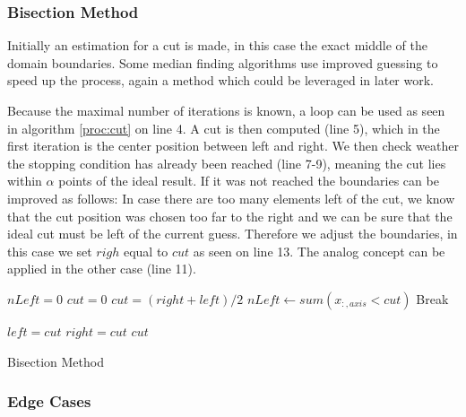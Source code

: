 \documentclass[]{article}
\begin{document}
\subsubsection{Bisection Method}

Initially an estimation for a cut is made, in this case the exact middle of the domain boundaries. Some median finding algorithms use improved guessing to speed up the process, again a method which could be leveraged in later work. 

Because the maximal number of iterations is known, a loop can be used as seen in algorithm \ref{proc:cut} on line 4. A cut is then computed (line 5), which in the first iteration is the center position between left and right. We then check weather the stopping condition has already been reached (line 7-9), meaning the cut lies within $\alpha$ points of the ideal result. If it was not reached the boundaries can be improved as follows: In case there are too many elements left of the cut, we know that the cut position was chosen too far to the right and we can be sure that the ideal cut must be left of the current guess. Therefore we adjust the boundaries, in this case we set $righ$ equal to $cut$ as seen on line 13. The analog concept can be applied in the other case (line 11). 

\begin{algorithm}[H]
		\begin{algorithmic}[1]
			\State $nLeft = 0$
			\State $cut = 0$
			\newline
			\State $cut = (right + left ) / 2 $
			\State $nLeft\gets sum(x_{:,axis} < cut)$ 
			\newline
			\State Break 
			\EndIf
			\newline
			
			\State $left = cut$
			\Else 
			\State $right = cut$
			\EndIf
			\newline
			\EndFor
			\State \Return $cut$
			\EndProcedure
		\end{algorithmic}
\caption{Bisection Method}
\label{proc:cut}
\end{algorithm}


\subsubsection{Edge Cases}
\end{document}
